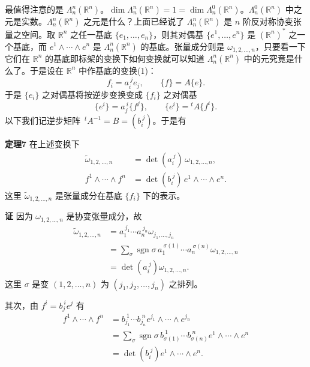 最值得注意的是 $\Lambda^n_n(\mathbb R^n)$。$\dim\Lambda^n_n(\mathbb R^n)=1=\dim\Lambda^0_n(\mathbb R^n)$。$\Lambda^0_n(\mathbb R^n)$ 中之元是实数。$\Lambda^n_n(\mathbb R^n)$ 之元是什么？上面已经说了 $\Lambda^n_n(\mathbb R^n)$ 是 $n$ 阶反对称协变张量之空间。取 $\mathbb R^n$ 之任一基底 $\{e_1,\ldots,e_n\}$，则其对偶基 $\{e^1,\ldots,e^n\}$ 是 $(\mathbb R^n)^*$ 之一个基底，而 $e^1\wedge\cdots\wedge e^n$ 是 $\Lambda^n_n(\mathbb R^n)$ 的基底。张量成分则是 $\omega_{1,2,\ldots,n}$，只要看一下它们在 $\mathbb R^n$ 的基底即标架的变换下如何变换就可以知道 $\Lambda^n_n(\mathbb R^n)$ 中的元究竟是什么了。于是设在 $\mathbb R^n$ 中作基底的变换(1)：
\[
 f_i=a_i^{\ j}e_j,\qquad\{f\}=A\{e\}.
\]
于是 $\{e_i\}$ 之对偶基将按逆步变换变成 $\{f_i\}$ 之对偶基
\[
 \{e^i\}=a_j^{\ i}\{f^j\},\qquad \{e^i\}={}^tA\{f^i\}.
\]
以下我们记逆步矩阵 $\,{}^tA^{-1}=B=(b_i^{\ j})$。于是有

\noindent\textbf{定理7}
在上述变换下
\begin{align}
 \widetilde\omega_{1,2,\ldots,n}&=\det(a_i^{\ j})\,\omega_{1,2,\ldots,n},\tag{29}\\
 f^1\wedge\cdots\wedge f^n&=\det(b_i^{\ j})\,e^1\wedge\cdots\wedge e^n.
 \tag{30}
\end{align}
这里 $\widetilde\omega_{1,2,\ldots,n}$ 是张量成分在基底 $\{f_i\}$ 下的表示。

\noindent\textbf{证}
因为 $\omega_{1,2,\ldots,n}$ 是协变张量成分，故
\begin{align*}
 \widetilde\omega_{1,2,\ldots,n}
 &=a_1^{\ j_1}\cdots a_n^{\ j_n}\omega_{j_1,\ldots,j_n}\\
 &=\sum_\sigma\operatorname{sgn}\sigma\,
 a_1^{\ \sigma(1)}\cdots a_n^{\ \sigma(n)}\omega_{1,2,\ldots,n}\\
 &=\det(a_i^{\ j})\omega_{1,2,\ldots,n}.
\end{align*}
这里 $\sigma$ 是变 $(1,2,\ldots,n)$ 为 $(j_1,j_2,\ldots,j_n)$ 之排列。

其次，由 $f^i=b_j^{\ i}e^j$ 有
\begin{align*}
 f^1\wedge\cdots\wedge f^n
 &=b_{j_1}^{\ 1}\cdots b_{j_n}^{\ n}e^{j_1}\wedge\cdots\wedge e^{j_n}\\
 &=\sum_\sigma\operatorname{sgn}\sigma\,b_{\sigma(1)}^{\ 1}\cdots b_{\sigma(n)}^{\ n}
 e^1\wedge\cdots\wedge e^n\\
 &=\det(b_i^{\ j})e^1\wedge\cdots\wedge e^n.
\end{align*}

